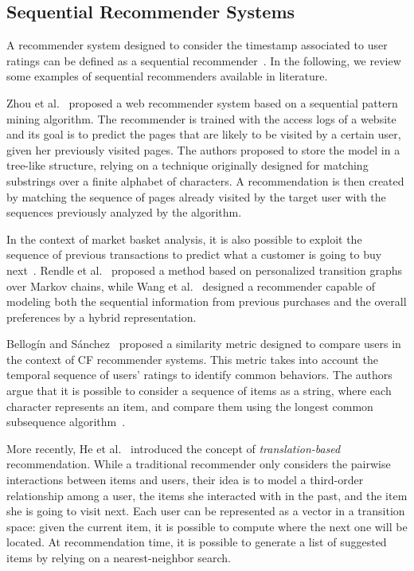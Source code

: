 \subsection{Sequential Recommender Systems}
\label{soa:sec:sequential}

A recommender system designed to consider the timestamp associated to user ratings can be defined as a sequential recommender~\cite{Quadrana2018}. In the following, we review some examples of sequential recommenders available in literature.

Zhou et al.~\cite{Zhou2004} proposed a web recommender system based on a sequential pattern mining algorithm. The recommender is trained with the access logs of a website and its goal is to predict the pages that are likely to be visited by a certain user, given her previously visited pages. The authors proposed to store the model in a tree-like structure, relying on a technique originally designed for matching substrings over a finite alphabet of characters. A recommendation is then created by matching the sequence of pages already visited by the target user with the sequences previously analyzed by the algorithm.

In the context of market basket analysis, it is also possible to exploit the sequence of previous transactions to predict what a customer is going to buy next~\cite{Aggarwal2015}. Rendle et al.~\cite{Rendle2010} proposed a method based on personalized transition graphs over Markov chains, while Wang et al.~\cite{Wang2015} designed a recommender capable of modeling both the sequential information from previous purchases and the overall preferences by a hybrid representation.

Bellog\'in and S\'anchez~\cite{Bellogin2017a} proposed a similarity metric designed to compare users in the context of CF recommender systems. This metric takes into account the temporal sequence of users' ratings to identify common behaviors. The authors argue that it is possible to consider a sequence of items as a string, where each character represents an item, and compare them using the longest common subsequence algorithm~\cite{Hirschberg1975}.

More recently, He et al.~\cite{He2017} introduced the concept of \emph{translation-based} recommendation. While a traditional recommender only considers the pairwise interactions between items and users, their idea is to model a third-order relationship among a user, the items she interacted with in the past, and the item she is going to visit next. Each user can be represented as a vector in a transition space: given the current item, it is possible to compute where the next one will be located. At recommendation time, it is possible to generate a list of suggested items by relying on a nearest-neighbor search.

